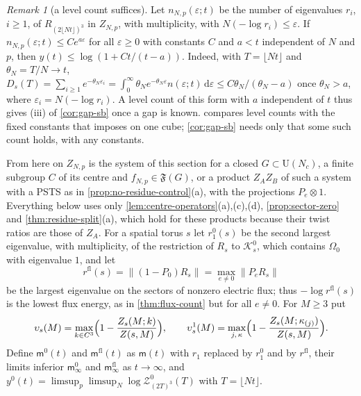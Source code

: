 \documentclass[11pt,a4paper]{amsart}
\theoremstyle{definition}
\theoremstyle{remark}
\newtheorem{remark}[theorem]{Remark}
\numberwithin{equation}{section}
\newcommand{\Kspace}{\mathcal{K}}    %
\newcommand{\Fclass}{\mathfrak{F}}   %
\newcommand{\norm}[1]{\lVert #1\rVert}     %
\newcommand{\dd}{\,\mathrm{d}}             %
\newcommand{\U}{\mathrm{U}}                %
\newcommand{\PSTS}{\textup{PSTS}}          %
\newcommand{\TT}{\mathbb{T}}               %
\newcommand{\Zpart}[2]{Z(#1,#2)}           %
\newcommand{\Zc}{\mathcal{Z}}              %
\newcommand{\Dexc}[2]{D_{#1}(#2)}          %
\newcommand{\cube}[1]{(2#1)^3}             %
\newcommand{\Omegazero}{\Omega_0}          %
\newcommand{\Bcirc}{\text{\upshape(B$^{\circ}$)}}   %
\begin{document}
\begin{remark}[a level count suffices]\label{rem:sb-count}
Let $n_{N,p}(\varepsilon;t)$ be the number of eigenvalues $r_i$, $i\ge1$, of $R_{\cube{\lfloor Nt\rfloor}}$ in $Z_{N,p}$, with multiplicity, with $N(-\log r_i)\le\varepsilon$. If $n_{N,p}(\varepsilon;t)\le Ce^{a\varepsilon}$ for all $\varepsilon\ge0$ with constants $C$ and $a<t$ independent of $N$ and $p$, then $y(t)\le\log(1+Ct/(t-a))$. Indeed, with $T=\lfloor Nt\rfloor$ and $\theta_N=T/N\to t$, $\Dexc{s}{T}=\sum_{i\ge1}e^{-\theta_N\varepsilon_i}=\int_0^\infty\theta_Ne^{-\theta_N\varepsilon}n(\varepsilon;t)\dd\varepsilon\le C\theta_N/(\theta_N-a)$ once $\theta_N>a$, where $\varepsilon_i=N(-\log r_i)$. A level count of this form with $a$ independent of $t$ thus gives \textup{(iii)} of \cref{cor:gap-sb} once a gap is known.  compares level counts with the fixed constants that \Bcirc{} imposes on one cube; \cref{cor:gap-sb} needs only that some such count holds, with any constants.
\end{remark}

\medskip
From here on $Z_{N,p}$ is the system of this section for a closed $G\subset\U(N_c)$, a finite subgroup $C$ of its centre and $f_{N,p}\in\Fclass(G)$, or a product $Z_AZ_B$ of such a system with a \PSTS{} as in \cref{prop:no-residue-control}\textup{(a)}, with the projections $P_e\otimes1$. Everything below uses only \cref{lem:centre-operators}\textup{(a),(c),(d)}, \cref{prop:sector-zero} and \cref{thm:residue-split}\textup{(a)}, which hold for these products because their twist ratios are those of $Z_A$. For a spatial torus $s$ let $r_1^0(s)$ be the second largest eigenvalue, with multiplicity, of the restriction of $R_s$ to $\Kspace^0_s$, which contains $\Omegazero$ with eigenvalue $1$, and let
\[
r^{\mathrm{fl}}(s)=\norm{(1-P_0)R_s}=\max_{e\ne0}\norm{P_eR_s}
\]
be the largest eigenvalue on the sectors of nonzero electric flux; thus $-\log r^{\mathrm{fl}}(s)$ is the lowest flux energy, as in \cref{thm:flux-count} but for all $e\ne0$. For $M\ge3$ put
\[
\upsilon_s(M)=\max_{k\in C^3}\Bigl(1-\frac{Z_s(M;k)}{\Zpart{s}{M}}\Bigr),\qquad \upsilon^1_s(M)=\max_{j,\,\kappa}\Bigl(1-\frac{Z_s(M;\kappa_{(j)})}{\Zpart{s}{M}}\Bigr).
\]
Define $\mathsf m^0(t)$ and $\mathsf m^{\mathrm{fl}}(t)$ as $\mathsf m(t)$ with $r_1$ replaced by $r_1^0$ and by $r^{\mathrm{fl}}$, their limits inferior $\mathsf m^0_\infty$ and $\mathsf m^{\mathrm{fl}}_\infty$ as $t\to\infty$, and $y^0(t)=\limsup_p\limsup_N\log\Zc^0_{\cube T}(T)$ with $T=\lfloor Nt\rfloor$.
\end{document}
